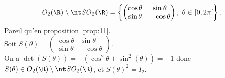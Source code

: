 \documentclass[11pt]{article}
\begin{document}
\begin{prop}{}{}
    \begin{equation*}
        O_2(\R) \setminus \SO_2(\R) = \left\{ \begin{pmatrix}\cos\theta & \sin\theta \\ \sin\theta & -\cos\theta \end{pmatrix}, ~ \theta\in[0,2\pi[ \right\}.
    \end{equation*}
    \tcblower
    \boxed{\subset} Pareil qu'en proposition \ref{prop:11}.\\
    \boxed{\supset} Soit $S(\theta)=\begin{pmatrix}\cos\theta&\sin\theta \\ \sin\theta & -\cos\theta\end{pmatrix}$.\\
    On a $\det(S(\theta))=-(\cos^2\theta+\sin^2(\theta))=-1$ donc $S(\theta)\in O_2(\R)\setminus\SO_2(\R)$, et $S(\theta)^2=I_2$.
\end{prop}
\end{document}
